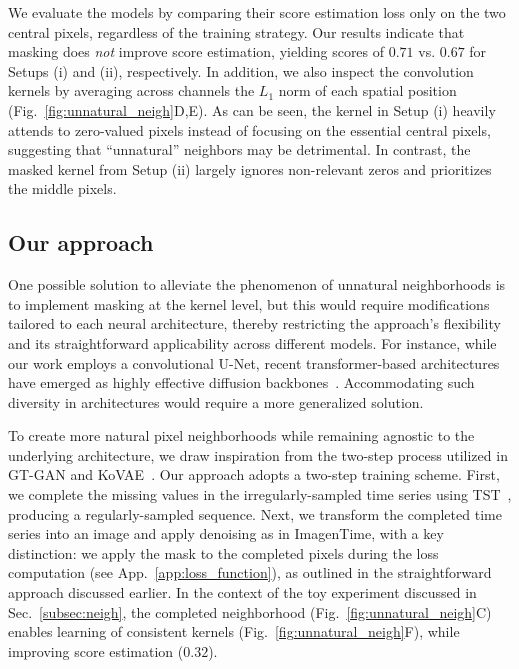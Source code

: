\documentclass{article}
\theoremstyle{plain}
\theoremstyle{definition}
\theoremstyle{remark}
\begin{document}
We evaluate the models by comparing their score estimation loss only on the two central pixels, regardless of the training strategy. Our results indicate that masking does \emph{not} improve score estimation, yielding scores of $0.71$ vs. $0.67$ for Setups (i) and (ii), respectively. In addition, we also inspect the convolution kernels by averaging across channels the $L_1$ norm of each spatial position (Fig.~\ref{fig:unnatural_neigh}D,E). As can be seen, the kernel in Setup (i) heavily attends to zero-valued pixels instead of focusing on the essential central pixels, suggesting that ``unnatural'' neighbors may be detrimental. In contrast, the masked kernel from Setup (ii) largely ignores non-relevant zeros and prioritizes the middle pixels. 

\vspace{-3mm}
\subsection{Our approach}
\vspace{-2mm}

One possible solution to alleviate the phenomenon of unnatural neighborhoods is to implement masking at the kernel level, but this would require modifications tailored to each neural architecture, thereby restricting the approach's flexibility and its straightforward applicability across different models. For instance, while our work employs a convolutional U-Net, recent transformer-based architectures have emerged as highly effective diffusion backbones~\cite{peebles2023scalable}. Accommodating such diversity in architectures would require a more generalized solution.


To create more natural pixel neighborhoods while remaining agnostic to the underlying architecture, we draw inspiration from the two-step process utilized in GT-GAN and KoVAE~\cite{jeon2022gt, naiman2024generative}. Our approach adopts a two-step training scheme. First, we complete the missing values in the irregularly-sampled time series using TST~\cite{zerveas2021transformer}, producing a regularly-sampled sequence. Next, we transform the completed time series into an image and apply denoising as in ImagenTime, with a key distinction: we apply the mask to the completed pixels during the loss computation
(see App.~\ref{app:loss_function}), as outlined in the straightforward approach discussed earlier. In the context of the toy experiment discussed in Sec.~\ref{subsec:neigh}, the completed neighborhood (Fig.~\ref{fig:unnatural_neigh}C) enables learning of consistent kernels (Fig.~\ref{fig:unnatural_neigh}F), while improving score estimation ($0.32$).
\end{document}
